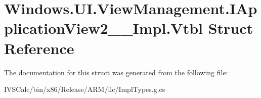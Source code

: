 \hypertarget{struct_windows_1_1_u_i_1_1_view_management_1_1_i_application_view2_____impl_1_1_vtbl}{}\section{Windows.\+U\+I.\+View\+Management.\+I\+Application\+View2\+\_\+\+\_\+\+Impl.\+Vtbl Struct Reference}
\label{struct_windows_1_1_u_i_1_1_view_management_1_1_i_application_view2_____impl_1_1_vtbl}


The documentation for this struct was generated from the following file\+:\begin{DoxyCompactItemize}
\item 
I\+V\+S\+Calc/bin/x86/\+Release/\+A\+R\+M/ilc/Impl\+Types.\+g.\+cs\end{DoxyCompactItemize}
